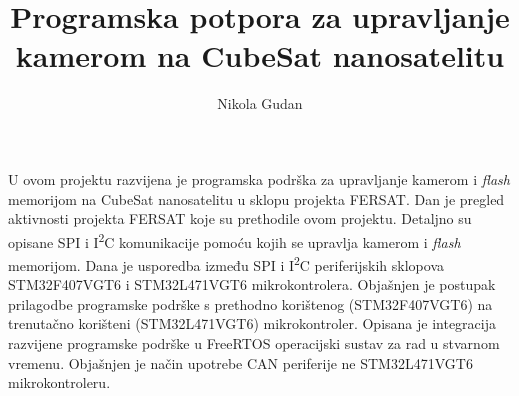 \documentclass[times, utf8, zavrsni, numeric]{fer}
\begin{document}

\title{Programska potpora za upravljanje kamerom na CubeSat nanosatelitu}

\author{Nikola Gudan}

\maketitle

\izvornik


\tableofcontents











\begin{sazetak}
U ovom projektu razvijena je programska podrška za upravljanje kamerom i \textit{flash} memorijom na CubeSat nanosatelitu u sklopu projekta FERSAT. Dan je pregled aktivnosti projekta FERSAT koje su prethodile ovom projektu. Detaljno su opisane SPI i I\textsuperscript{2}C komunikacije pomoću kojih se upravlja kamerom i \textit{flash} memorijom. Dana je usporedba između SPI i I\textsuperscript{2}C periferijskih sklopova STM32F407VGT6 i STM32L471VGT6 mikrokontrolera. Objašnjen je postupak prilagodbe programske podrške s prethodno korištenog (STM32F407VGT6) na trenutačno korišteni (STM32L471VGT6) mikrokontroler. Opisana je integracija razvijene programske podrške u FreeRTOS operacijski sustav za rad u stvarnom vremenu. Objašnjen je način upotrebe CAN periferije ne STM32L471VGT6 mikrokontroleru.

\end{sazetak}
\end{document}

